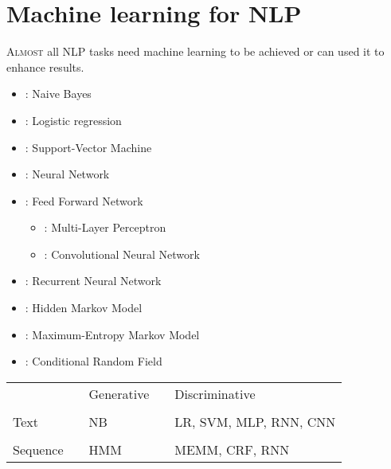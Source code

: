 \documentclass{KBook}
\begin{document}
		\mainmatter
	
\fi

\chapter{Machine learning for NLP}

\begin{introduction}
	
	\lettrine{A}{lmost} all NLP tasks need machine learning to be achieved or can used it to enhance results. 
	
\end{introduction}

\begin{itemize}
	\item {}: Naive Bayes
	\item {}: Logistic regression
	\item {}: Support-Vector Machine
	\item {}: Neural Network
	\item {}: Feed Forward Network
	\begin{itemize}
		\item {}: Multi-Layer Perceptron
		\item {}: Convolutional Neural Network
	\end{itemize}
	\item {}: Recurrent Neural Network
	\item {}: Hidden Markov Model
	\item {}: Maximum-Entropy Markov Model
	\item {}: Conditional Random Field
\end{itemize}

\begin{tabular}{p{}lp{}lp{}}
	
	&& Generative && Discriminative \\
	
	&&&&\\
	
	Text && NB && LR, SVM, MLP, RNN, CNN \\
	
	&&&&\\
	
	Sequence && HMM  && MEMM, CRF, RNN \\
	
\end{tabular}
\end{document}
